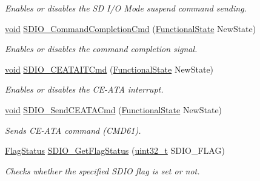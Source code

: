 \begin{DoxyCompactItemize}
\begin{DoxyCompactList}\small\item\em Enables or disables the SD I/O Mode suspend command sending. \end{DoxyCompactList}\item 
\hyperlink{usb__devapi_8h_afabf60e7f57651d6d595a02c75f07cd0}{void} \hyperlink{group___s_d_i_o___exported___functions_ga1bbe98c629812bc62121d9c8b2c5e21b}{S\+D\+I\+O\+\_\+\+Command\+Completion\+Cmd} (\hyperlink{agilefox_2library_2inc_2stm32f10x__type_8h_ac9a7e9a35d2513ec15c3b537aaa4fba1}{Functional\+State} New\+State)
\begin{DoxyCompactList}\small\item\em Enables or disables the command completion signal. \end{DoxyCompactList}\item 
\hyperlink{usb__devapi_8h_afabf60e7f57651d6d595a02c75f07cd0}{void} \hyperlink{group___s_d_i_o___exported___functions_gab44b8cbc21be000a291563076159503b}{S\+D\+I\+O\+\_\+\+C\+E\+A\+T\+A\+I\+T\+Cmd} (\hyperlink{agilefox_2library_2inc_2stm32f10x__type_8h_ac9a7e9a35d2513ec15c3b537aaa4fba1}{Functional\+State} New\+State)
\begin{DoxyCompactList}\small\item\em Enables or disables the C\+E-\/\+A\+TA interrupt. \end{DoxyCompactList}\item 
\hyperlink{usb__devapi_8h_afabf60e7f57651d6d595a02c75f07cd0}{void} \hyperlink{group___s_d_i_o___exported___functions_ga8dc7f17804bdb745b42f6647c8487b4c}{S\+D\+I\+O\+\_\+\+Send\+C\+E\+A\+T\+A\+Cmd} (\hyperlink{agilefox_2library_2inc_2stm32f10x__type_8h_ac9a7e9a35d2513ec15c3b537aaa4fba1}{Functional\+State} New\+State)
\begin{DoxyCompactList}\small\item\em Sends C\+E-\/\+A\+TA command (C\+M\+D61). \end{DoxyCompactList}\item 
\hyperlink{agilefox_2library_2inc_2stm32f10x__type_8h_a89136caac2e14c55151f527ac02daaff}{Flag\+Status} \hyperlink{group___s_d_i_o___exported___functions_ga644514b4b3c95c5c4326d99cd166f6f9}{S\+D\+I\+O\+\_\+\+Get\+Flag\+Status} (\hyperlink{_p_e___types_8h_a33594304e786b158f3fb30289278f5af}{uint32\+\_\+t} S\+D\+I\+O\+\_\+\+F\+L\+AG)
\begin{DoxyCompactList}\small\item\em Checks whether the specified S\+D\+IO flag is set or not. \end{DoxyCompactList}\item 

\end{DoxyCompactItemize}
